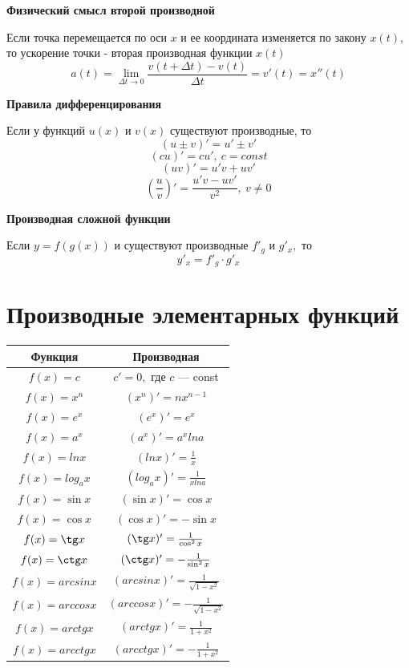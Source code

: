 \documentclass[a5paper, 8pt]{extarticle}
\begin{document}
\begin{center}
\textbf{Физический смысл второй производной}
\end{center}
Если точка перемещается по оси $x$ и ее координата изменяется по закону $x(t),$ то ускорение точки - вторая производная функции $x(t)$ 
$$
a(t)=\lim\limits_{\Delta t\to 0}\frac{v(t+\Delta t)-v(t)}{\Delta t}=v'(t)=x''(t)
$$

\begin{center}
\textbf{Правила дифференцирования}
\end{center}

Если у функций $u(x)$ и $v(x)$ существуют производные, то
$$
(u\pm v)'=u'\pm v'
$$
$$
(cu)'=cu', \ c=const
$$
$$
(uv)'=u'v+uv'
$$
$$
\left(\frac{u}{v}\right)'=\frac{u'v-uv'}{v^2},\ v\not= 0
$$

\begin{center}
\textbf{Производная сложной функции}
\end{center}

Если $y=f(g(x))$ и существуют производные $f'_g$ и $g'_x,$ то
$$y'_x=f'_g\cdot g'_x$$

\section{Производные элементарных функций}

\begin{center}
{\setlength{\extrarowheight}{5pt}
\begin{tabular}{|c|c|}
\hline 
\rowcolor{Gray}
Функция & Производная \\[5pt]
\hline
$f(x)=c$ & $c'=0,$ где $c$ --- const \\[5pt]
\hline
$f(x)=x^n$ & $(x^n)'=nx^{n-1}$ \\[5pt]
\hline
$f(x)=e^x$ & $(e^x)'=e^x$ \\[5pt]
\hline
$f(x)=a^x$ & $(a^x)'=a^x lna$ \\[5pt]
\hline
$f(x)=lnx$ & $(lnx)'=\frac{1}{x}$ \\[5pt]
\hline
$f(x)=log_ax$ & $(log_ax)'=\frac{1}{xlna}$ \\[5pt]
\hline
$f(x)=\sin x$ & $(\sin x)'=\cos x$ \\[5pt]
\hline
$f(x)=\cos x$ & $(\cos x)'=-\sin x$ \\[5pt]
\hline
$f(x)=\tg x$ & $(\tg x)'=\frac{1}{\cos^2 x}$ \\[5pt]
\hline
$f(x)=\ctg x$ & $(\ctg x)'= -\frac{1}{\sin^2 x}$ \\[5pt]
\hline
$f(x)=arcsin x$ & $(arcsin x)'=\frac{1}{\sqrt{1-x^2}}$ \\[5pt]
\hline
$f(x)=arccos x$ & $(arccos x)'=-\frac{1}{\sqrt{1-x^2}}$ \\[5pt]
\hline
$f(x)=arctg x$ & $(arctg x)'=\frac{1}{1+x^2}$ \\[5pt]
\hline
$f(x)=arcctg x$ & $(arcctg x)'=-\frac{1}{1+x^2}$ \\[5pt]
\hline
\end{tabular} 
}
\end{center}
\end{document}
